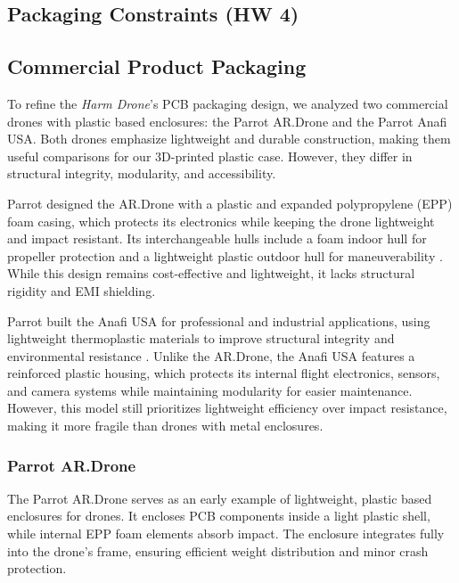 \documentclass[12pt]{article}
\begin{document}
\subsection{Packaging Constraints (HW 4)}
\subsection{Commercial Product Packaging}

\par To refine the \textit{Harm Drone}’s PCB packaging design, we analyzed two commercial drones with plastic based enclosures: the Parrot AR.Drone and the Parrot Anafi USA. Both drones emphasize lightweight and durable construction, making them useful comparisons for our 3D-printed plastic case. However, they differ in structural integrity, modularity, and accessibility.

\par Parrot designed the AR.Drone with a plastic and expanded polypropylene (EPP) foam casing, which protects its electronics while keeping the drone lightweight and impact resistant. Its interchangeable hulls include a foam indoor hull for propeller protection and a lightweight plastic outdoor hull for maneuverability \cite{parrot1}. While this design remains cost-effective and lightweight, it lacks structural rigidity and EMI shielding.

\par Parrot built the Anafi USA for professional and industrial applications, using lightweight thermoplastic materials to improve structural integrity and environmental resistance \cite{parrot2}. Unlike the AR.Drone, the Anafi USA features a reinforced plastic housing, which protects its internal flight electronics, sensors, and camera systems while maintaining modularity for easier maintenance. However, this model still prioritizes lightweight efficiency over impact resistance, making it more fragile than drones with metal enclosures.

\subsubsection{Parrot AR.Drone}

\par The Parrot AR.Drone serves as an early example of lightweight, plastic based enclosures for drones. It encloses PCB components inside a light plastic shell, while internal EPP foam elements absorb impact. The enclosure integrates fully into the drone’s frame, ensuring efficient weight distribution and minor crash protection.
\end{document}
